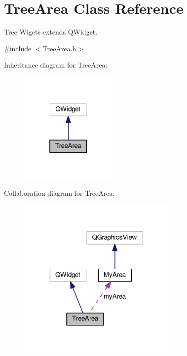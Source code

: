 \hypertarget{classTreeArea}{\section{Tree\+Area Class Reference}
\label{classTreeArea}
}


Tree Wigets extends Q\+Widget.  




{\ttfamily \#include $<$Tree\+Area.\+h$>$}



Inheritance diagram for Tree\+Area\+:\nopagebreak
\begin{figure}[H]
\begin{center}
\leavevmode
\includegraphics[width=136pt]{classTreeArea__inherit__graph}
\end{center}
\end{figure}


Collaboration diagram for Tree\+Area\+:\nopagebreak
\begin{figure}[H]
\begin{center}
\leavevmode
\includegraphics[width=221pt]{classTreeArea__coll__graph}
\end{center}
\end{figure}

